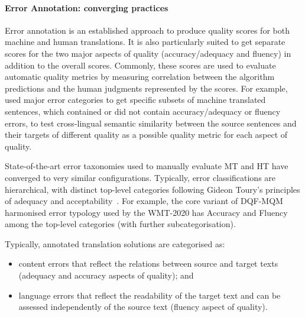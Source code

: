 \paragraph{\label{par:errors_best}Error Annotation: converging practices}
Error annotation is an established approach to produce quality scores for both machine and human translations. 
It is also particularly suited to get separate scores for the two major aspects of quality (accuracy/adequacy and fluency) in addition to the overall scores. Commonly, these scores are used to evaluate automatic quality metrics by measuring correlation between the algorithm predictions and the human judgments represented by the scores. 
For example, \citet{Ustaszewski2019} used major error categories to get specific subsets of machine translated sentences, which contained or did not contain accuracy/adequacy or fluency errors, to test cross-lingual semantic similarity between the source sentences and their targets of different quality as a possible quality metric for each aspect of quality. 

State-of-the-art error taxonomies used to manually evaluate MT and HT have converged to very similar configurations. Typically, error classifications are hierarchical, with distinct top-level categories following Gideon Toury's principles of adequacy and acceptability~\cite{Toury1995}. 
For example, the core variant of \gls{DQF}-\gls{MQM} harmonised error typology used by the WMT-2020 has Accuracy and Fluency among the top-level categories (with further subcategorisation). 

Typically, annotated translation solutions are categorised as:

\begin{itemize}\compresslist{}
	\item content errors that reflect the relations between source and target texts (adequacy and accuracy aspects of quality); and 
	\item language errors that reflect the readability of the target text and can be assessed independently of the source text (fluency aspect of quality). 
\end{itemize}

